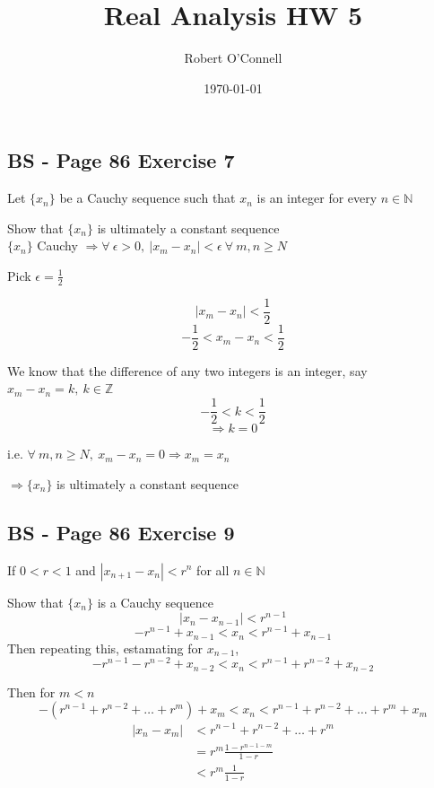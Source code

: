 \documentclass{article}
\title{\textbf{Real Analysis HW 5}}
\author{Robert O'Connell}
\date{\today}
\begin{document}
\maketitle
\vspace{5mm}

\subsection*{BS - Page 86 Exercise 7}
Let \(\{x_n\}\) be a Cauchy sequence such that \(x_n\) is an integer for every
\(n \in \mathbb{N}\)

Show that \(\{x_n\}\) is ultimately a constant sequence
\\

\(\{x_n\}\) Cauchy \(\Rightarrow \forall \ \epsilon > 0, \ |x_m - x_n| < \epsilon \ \forall \ m,n \geq N\)

Pick \(\epsilon = \frac{1}{2}\)

\[
|x_m - x_n| < \frac{1}{2}
\]
\[
-\frac{1}{2} < x_m - x_n < \frac{1}{2}
\]

We know that the difference of any two integers is an integer, say \(x_m - x_n = k , \ k \in \mathbb{Z}\)
\[
-\frac{1}{2} < k < \frac{1}{2}
\]
\[
\Rightarrow k = 0
\]

i.e. \(\forall \ m,n \geq N, \ x_m - x_n = 0 \Rightarrow x_m = x_n\)

\(\Rightarrow \{x_n\}\) is ultimately a constant sequence





\subsection*{BS - Page 86 Exercise 9}
If \(0 < r < 1\) and \(|x_{n+1} - x_n| < r^n\)  for all \(n \in \mathbb{N}\) 

Show that \(\{x_n\}\) is a Cauchy sequence
\\

\[
|x_{n} - x_{n-1}| < r^{n-1}
\]
\[
-r^{n-1} + x_{n-1} < x_n < r^{n-1} + x_{n-1} 
\]
Then repeating this, estamating for \(x_{n-1}\),
\[
-r^{n-1} - r^{n-2} + x_{n-2} < x_n < r^{n-1} + r^{n-2} + x_{n-2}
\]

Then for \(m < n\)
\[
-(r^{n-1} + r^{n-2} + \dots + r^{m}) + x_m < x_n < r^{n-1} + r^{n-2} + \dots + r^{m} + x_m
\]
\begin{align*}
    |x_n - x_m| &< r^{n-1} + r^{n-2} + \dots + r^{m} \\
    &= r^m \frac{1 - r^{n-1-m}}{1-r} \\
    &< r^m \frac{1}{1-r}
\end{align*}
\end{document}
